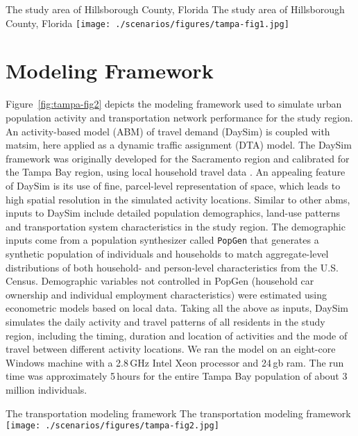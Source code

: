 \createfigure%
{The study area of Hillsborough County, Florida}%
{The study area of Hillsborough County, Florida}%
{\label{fig:tampa-fig1}}%
{\texttt{[image: ./scenarios/figures/tampa-fig1.jpg]}}%
{\citet[][]{GurramEtAl_AQAH_2015}}

\section{Modeling Framework}
Figure~\ref{fig:tampa-fig2} depicts the modeling framework used to simulate urban population activity and transportation network performance for the study region. 
An activity-based model (ABM) of travel demand (DaySim) is coupled with \gls{matsim}, here applied as a dynamic traffic assignment (DTA) model. 
The DaySim framework was originally developed for the Sacramento region \citep[][]{BradleyEtAl_JOCM_2010} and calibrated for the Tampa Bay region, using local household travel data \citep[][]{GliebeEtAl_TRB_2014}. 
An appealing feature of DaySim is its use of fine, parcel-level representation of space, which leads to high spatial resolution in the simulated activity locations.  
Similar to other \glspl{abm}, inputs to DaySim include detailed population demographics, land-use patterns and transportation system characteristics in the study region. The demographic inputs come from a population synthesizer called \lstinline|PopGen| \citep[][]{PendyalaEtAl_2011} that generates a synthetic population of individuals and households to match aggregate-level distributions of both household- and person-level characteristics from the U.S. Census. 
Demographic variables not controlled in PopGen (\eg household car ownership and individual employment characteristics) were estimated using econometric models based on local data. 
Taking all the above as inputs, DaySim simulates the daily activity and travel patterns of all residents in the study region, including the timing, duration and location of activities and the mode of travel between different activity locations. 
We ran the model on an eight-core Windows machine with a 2.8\,GHz Intel Xeon processor and 24\,\gls{gb} \gls{ram}. 
The run time was approximately 5\,hours for the entire Tampa Bay population of about 3\,million individuals.

\createfigure%
{The transportation modeling framework}%
{The transportation modeling framework}%
{\label{fig:tampa-fig2}}%
{\texttt{[image: ./scenarios/figures/tampa-fig2.jpg]}}%
{}

